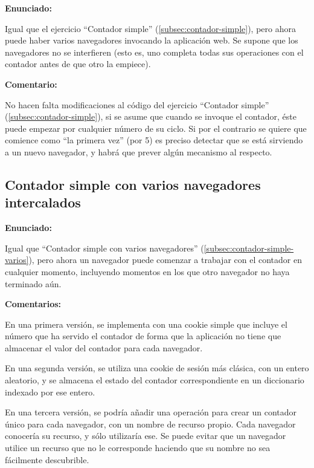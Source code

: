 \textbf{Enunciado:}

Igual que el ejercicio ``Contador simple'' (\ref{subsec:contador-simple}), pero ahora puede haber varios navegadores invocando la aplicación web. Se supone que los navegadores no se interfieren (esto es, uno completa todas sus operaciones con el contador antes de que otro la empiece).

\textbf{Comentario:}

No hacen falta modificaciones al código del ejercicio ``Contador simple'' (\ref{subsec:contador-simple}), si se asume que cuando se invoque el contador, éste puede empezar por cualquier número de su ciclo. Si por el contrario se quiere que comience como ``la primera vez'' (por 5) es preciso detectar que se está sirviendo a un nuevo navegador, y habrá que prever algún mecanismo al respecto.


\subsection{Contador simple con varios navegadores intercalados}
\label{subsec:contador-simple-varios-intercalados}

\textbf{Enunciado:}

Igual que ``Contador simple con varios navegadores'' (\ref{subsec:contador-simple-varios}), pero ahora un navegador puede comenzar a trabajar con el contador en cualquier momento, incluyendo momentos en los que otro navegador no haya terminado aún.

\textbf{Comentarios:}

En una primera versión, se implementa con una cookie simple que incluye el número que ha servido el contador de forma que la aplicación no tiene que almacenar el valor del contador para cada navegador.

En una segunda versión, se utiliza una cookie de sesión más clásica, con un entero aleatorio, y se almacena el estado del contador correspondiente en un diccionario indexado por ese entero.

En una tercera versión, se podría añadir una operación para crear un contador único para cada navegador, con un nombre de recurso propio. Cada navegador conocería su recurso, y sólo utilizaría ese. Se puede evitar que un navegador utilice un recurso que no le corresponde haciendo que su nombre no sea fácilmente descubrible.

